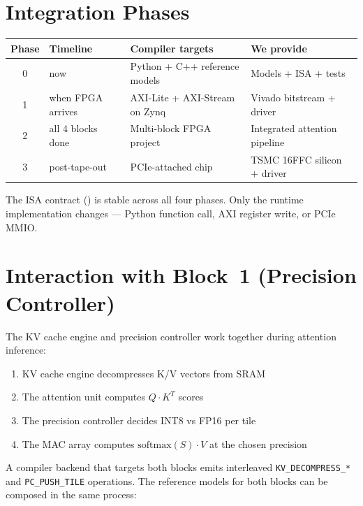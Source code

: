 \documentclass[11pt]{article}
\begin{document}
\section{Integration Phases}

\begin{table}[h]
\centering
\small
\renewcommand{\arraystretch}{1.2}
\begin{tabular}{@{}c p{3cm} p{4cm} p{4.5cm}@{}}
\toprule
Phase & Timeline & Compiler targets & We provide \\
\midrule
0 & now & Python + C++ reference models & Models + ISA + tests \\
1 & when FPGA arrives & AXI-Lite + AXI-Stream on Zynq & Vivado bitstream + driver \\
2 & all 4 blocks done & Multi-block FPGA project & Integrated attention pipeline \\
3 & post-tape-out & PCIe-attached chip & TSMC 16FFC silicon + driver \\
\bottomrule
\end{tabular}
\end{table}

\noindent The ISA contract () is
stable across all four phases. Only the runtime implementation changes ---
Python function call, AXI register write, or PCIe MMIO.

\section{Interaction with Block~1 (Precision Controller)}

The KV cache engine and precision controller work together during
attention inference:

\begin{enumerate}
\item KV cache engine decompresses K/V vectors from SRAM
\item The attention unit computes $Q \cdot K^T$ scores
\item The precision controller decides INT8 vs FP16 per tile
\item The MAC array computes $\mathrm{softmax}(S) \cdot V$ at the chosen precision
\end{enumerate}

\noindent A compiler backend that targets both blocks emits interleaved
\texttt{KV\_DECOMPRESS\_*} and \texttt{PC\_PUSH\_TILE} operations. The
reference models for both blocks can be composed in the same process:
\end{document}
